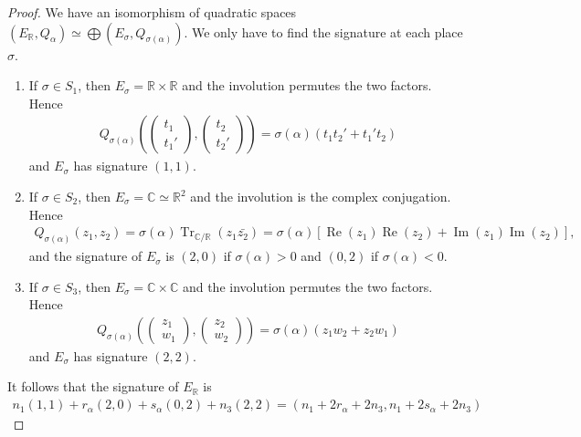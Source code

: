 \documentclass[10pt,a4paper]{amsart}
\newcommand{\C}{\mathbb{C}}
\newcommand{\R}{\mathbb{R}}
\newcommand{\Tr}{\operatorname{Tr}}
\newcommand{\im}{\operatorname{Im}}
\newcommand{\re}{\operatorname{Re}}
\begin{document}
\begin{proof}
We have an isomorphism of quadratic spaces $(E_\R, Q_\alpha) \simeq \bigoplus (E_\sigma,Q_{\sigma(\alpha)})$. We only have to find the signature at each place $\sigma$. 
\begin{enumerate}
    \item If $\sigma \in S_1$, then $E_\sigma=\R \times \R$ and the involution permutes the two factors. Hence 
    \begin{align}
        Q_{\sigma(\alpha)}\left ( \begin{pmatrix}
            t_1 \\ t_1'
        \end{pmatrix},\begin{pmatrix}
            t_2 \\ t_2'
        \end{pmatrix}\right )=\sigma(\alpha)(t_1t_2'+t_1't_2)
    \end{align}
    and $E_\sigma$ has signature $(1,1)$.
    \item If $\sigma \in S_2$, then $E_\sigma=\C \simeq \R^2$ and the involution is the complex conjugation. Hence 
    \begin{align}
        Q_{\sigma(\alpha)}\left ( z_1,z_2\right )=\sigma(\alpha)\Tr_{\C/\R}(z_1\bar{z_2})=\sigma(\alpha)\left [\re(z_1)\re(z_2)+\im(z_1)\im(z_2) \right ],
    \end{align}
    and the signature of $E_\sigma$ is $(2,0)$ if $\sigma(\alpha)>0$ and $(0,2)$ if $\sigma(\alpha)<0$.
    \item If $\sigma \in S_3$, then $E_\sigma=\C\times \C$ and the involution permutes the two factors. Hence 
    \begin{align}
        Q_{\sigma(\alpha)}\left ( \begin{pmatrix}
            z_1 \\ w_1
        \end{pmatrix},\begin{pmatrix}
            z_2 \\ w_2
        \end{pmatrix}\right )=\sigma(\alpha)(z_1w_2+z_2w_1)
    \end{align}
    and $E_\sigma$ has signature $(2,2)$. 
\end{enumerate}
It follows that the signature of $E_\R$ is
\begin{align}
    n_1(1,1)+r_\alpha(2,0)+s_\alpha(0,2)+n_3(2,2)=(n_1+2r_\alpha+2n_3,n_1+2s_\alpha+2n_3)
\end{align}
\end{proof}
\end{document}

